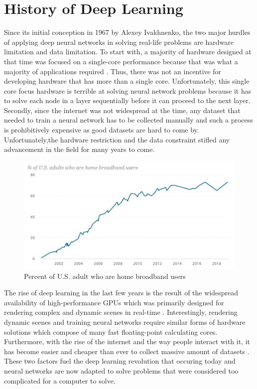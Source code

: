 \documentclass[conference]{IEEEtran}
\begin{document}
    
    \section{History of Deep Learning}
        Since its initial conception in 1967 by Alexey Ivakhnenko, the two major hurdles of applying deep neural networks in solving real-life problems are hardware limitation and data limitation. To start with, a majority of hardware designed at that time was focused on a single-core performance because that was what a majority of applications required \cite{inproceedings}. Thus, there was not an incentive for developing hardware that has more than a single core. Unfortunately, this single core focus hardware is terrible at solving neural network problems because it has to solve each node in a layer sequentially before it can proceed to the next layer. Secondly, since the internet was not widespread at the time, any dataset that needed to train a neural network has to be collected manually \cite{pew_research_center} and such a process is prohibitively expensive as good datasets are hard to come by. Unfortunately,the hardware restriction and the data constraint stifled any advancement in the field for many years to come.

        \begin{figure}[!htb]
            \centering
            \captionsetup{justification=centering}
            \includegraphics[width=\linewidth]{USBroadband.png}
            \caption{Percent of U.S. adult who are home broadband users}  
        \end{figure}

        The rise of deep learning in the last few years is the result of the widespread availability of high-performance GPUs which was primarily designed for rendering complex and dynamic scenes in real-time \cite{nickolls_dally_2010}. Interestingly, rendering dynamic scenes and training neural networks require similar forms of hardware solutions which compose of many fast floating-point calculating cores. Furthermore, with the rise of the internet and the way people interact with it, it has become easier and cheaper than ever to collect massive amount of datasets \cite{deng_dong_socher_li_li_fei-fei_2009}. These two factors fuel the deep learning revolution that occuring today and neural networks are now adapted to solve problems that were considered too complicated for a computer to solve.
        
\end{document}
